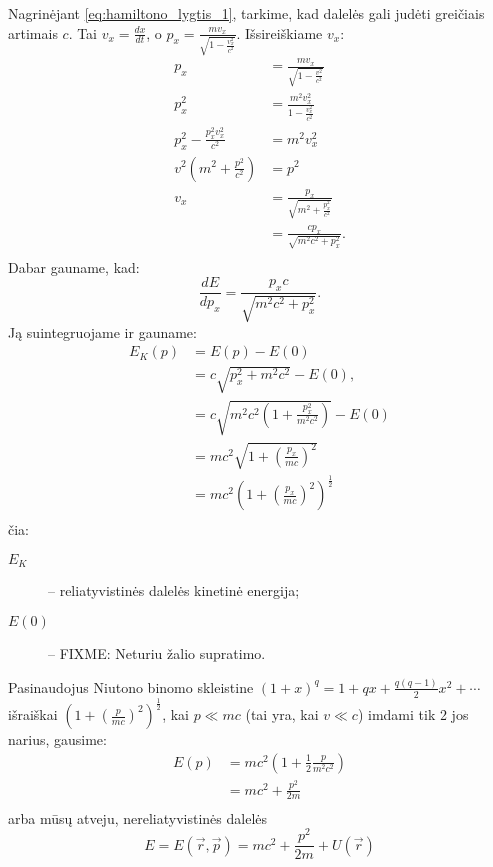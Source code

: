 Nagrinėjant \ref{eq:hamiltono_lygtis_1}, tarkime, kad dalelės gali
judėti greičiais artimais $c$. Tai $v_{x} = \frac{dx}{dt}$, o
$p_{x} = \frac{mv_{x}}{\sqrt{1 - \frac{v_{x}^{2}}{c^{2}}}}$.
Išsireiškiame $v_{x}$:
\begin{align*}
  p_{x} &= \frac{mv_{x}}{\sqrt{1 - \frac{v^{2}}{c^{2}}}} \\
  p^{2}_{x} &= \frac{m^{2}v_{x}^{2}}{1 - \frac{v_{x}^{2}}{c^{2}}} \\
  p^{2}_{x} - \frac{p_{x}^{2}v_{x}^{2}}{c^{2}} &= m^{2}v_{x}^{2} \\
  v^{2}\left( m^{2} + \frac{p^{2}}{c^{2}} \right) &= p^{2} \\
  v_{x}
  &= \frac{p_{x}}{\sqrt{m^{2} + \frac{p_{x}^{2}}{c^{2}}}} \\
  &= \frac{cp_{x}}{\sqrt{m^{2}c^{2} + p_{x}^{2}}}. \\
\end{align*}
Dabar gauname, kad:
\begin{equation*}
  \frac{dE}{dp_{x}} = \frac{p_{x}c}{\sqrt{m^{2}c^{2} + p_{x}^{2}}}.
\end{equation*}
Ją suintegruojame ir gauname:
\begin{align*}
  E_{K}(p)
  &= E(p) - E(0) \\
  &= c\sqrt{p_{x}^{2} + m^{2}c^{2}} - E(0), \\
  &= c\sqrt{m^{2}c^{2}
    \left( 1 + \frac{p_{x}^{2}}{m^{2}c^{2}}  \right)}
    - E(0) \\
  &= mc^{2}\sqrt{1 + \left( \frac{p_{x}}{mc} \right)^{2}} \\
  &=  mc^{2}
    \left(1 + \left( \frac{p_{x}}{mc} \right)^{2}\right)^{\frac{1}{2}} \\
\end{align*}
čia:
\begin{description}
  \item[$E_{K}$] – reliatyvistinės dalelės kinetinė energija;
  \item[$E(0)$] – FIXME: Neturiu žalio supratimo.
\end{description}

Pasinaudojus Niutono binomo skleistine
$(1+x)^{q} = 1 + qx + \frac{q(q-1)}{2}x^{2}+\cdots$ išraiškai
$\left( 1 + \left( \frac{p}{mc} \right)^{2} \right)^{\frac{1}{2}}$, kai
$p \ll mc$ (tai yra, kai $v \ll c$) imdami tik 2 jos narius,
gausime:
\begin{align*}
  E(p)
  &= mc^{2}\left( 1 + \frac{1}{2}\frac{p}{m^{2}c^{2}} \right) \\
  &= mc^{2} + \frac{p^{2}}{2m} \\
\end{align*}
arba mūsų atveju, nereliatyvistinės dalelės
\begin{equation*}
  E
  = E(\vec{r}, \vec{p})
  = mc^{2} + \frac{p^{2}}{2m} + U(\vec{r})
\end{equation*}


